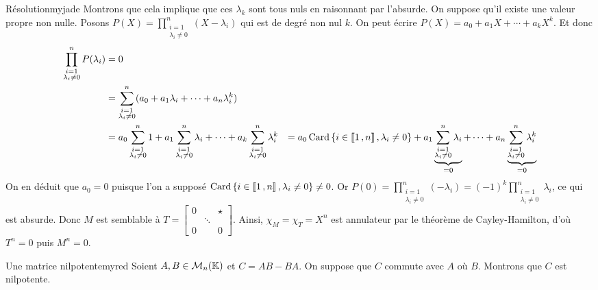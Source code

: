 \begin{demo}{Résolution}{myjade}
        Montrons que cela implique que ces $\lambda_k$ sont tous nuls en raisonnant par l’absurde. On suppose qu’il existe une valeur propre non nulle. Posons $P(X) = \prod_{\substack{i = 1 \\ \lambda_i \neq 0}}^{n} (X - \lambda_i)$ qui est de degré non nul $k$. On peut écrire $P(X) = a_0 + a_1 X + \cdots + a_k X^k$. Et donc 
        \begin{align*}
            \prod_{\substack{i = 1 \\ \lambda_i \neq 0}}^{n} P(\lambda_i) 
            &= 0 \\
            &= \sum_{\substack{i = 1 \\ \lambda_i \neq 0}}^{n} (a_0 + a_1 \lambda_i + \cdots + a_n \lambda_i^k) \\
            &= a_0 \sum_{\substack{i = 1 \\ \lambda_i \neq 0}}^{n} 1 + a_1 \sum_{\substack{i = 1 \\ \lambda_i \neq 0}}^{n} \lambda_i + \cdots + a_k \sum_{\substack{i = 1 \\ \lambda_i \neq 0}}^{n} \lambda_i^k 
            &= a_0 \operatorname{Card}\left\{i \in \left\llbracket 1 \, , n \right\rrbracket, \lambda_i \neq 0\right\} + a_1 \underbrace{\sum_{\substack{i = 1 \\ \lambda_i \neq 0}}^{n} \lambda_i}_{= 0} + \cdots + a_n \underbrace{\sum_{\substack{i = 1 \\ \lambda_i \neq 0}}^{n} \lambda_i^k}_{= 0}
        \end{align*}
        On en déduit que $a_0 = 0$ puisque l’on a supposé $\operatorname{Card}\left\{i \in \left\llbracket 1 \, , n \right\rrbracket, \lambda_i \neq 0\right\} \neq 0$. Or $P(0) = \prod_{\substack{i = 1 \\ \lambda_i \neq 0}}^{n} (- \lambda_i) = (-1)^k \prod_{\substack{i = 1 \\ \lambda_i \neq 0}}^{n} \lambda_i$, ce qui est absurde. Donc $M$ est semblable à $T = \begin{bmatrix}
            0 & & \star \\
             & \ddots & \\
            0 & & 0
        \end{bmatrix}$. Ainsi, $\chi_M = \chi_T = X^n$ est annulateur par le théorème de Cayley-Hamilton, d’où $T^n = 0$ puis $M^n = 0$.
    \end{demo}

    \begin{omed}{Une matrice nilpotente}{myred}
        Soient $A,B \in \mathcal{M}_{n}(\mathbb{K})$ et $C = AB - BA$. On suppose que $C$ commute avec $A$ où $B$. Montrons que $C$ est nilpotente.
    \end{omed}

